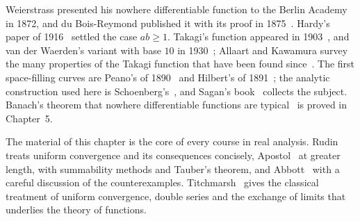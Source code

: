 Weierstrass presented his nowhere differentiable function to the Berlin Academy in 1872, and du Bois-Reymond published it with its proof in 1875~\cite{duboisreymond1875}. Hardy's paper of 1916~\cite{hardy1916} settled the case $ab\ge1$. Takagi's function appeared in 1903~\cite{takagi1903}, and van der Waerden's variant with base $10$ in 1930~\cite{vanderwaerden1930}; Allaart and Kawamura survey the many properties of the Takagi function that have been found since~\cite{allaart2012}. The first space-filling curves are Peano's of 1890~\cite{peano1890curve} and Hilbert's of 1891~\cite{hilbert1891}; the analytic construction used here is Schoenberg's~\cite{schoenberg1938}, and Sagan's book~\cite{sagan1994} collects the subject. Banach's theorem that nowhere differentiable functions are typical~\cite{banach1931} is proved in Chapter~5.

The material of this chapter is the core of every course in real analysis. Rudin~\cite[Chap.~7]{rudin1976} treats uniform convergence and its consequences concisely, Apostol~\cite[Chaps.~8 and~9]{apostol1974} at greater length, with summability methods and Tauber's theorem, and Abbott~\cite[Chap.~6]{abbott2015} with a careful discussion of the counterexamples. Titchmarsh~\cite[Chap.~1]{titchmarsh1939} gives the classical treatment of uniform convergence, double series and the exchange of limits that underlies the theory of functions.

\chapterreferences
